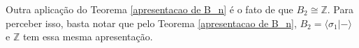 \documentclass[a4paper,portuguese,11pt,twoside, leqno]{book}
\theoremstyle{definition}
\newtheorem*{solution}{Solução}
\begin{document}
	
	
	
	
	
	
	
	
	\par\vspace{0.3cm} Outra aplicação do Teorema \eqref{apresentacao de B_n} é o fato de que $B_2\cong\mathbb{Z}$. Para perceber isso, basta notar que pelo Teorema \eqref{apresentacao de B_n}, $B_2 = \langle \sigma_1 | - \rangle$ e $\mathbb{Z}$ tem essa mesma apresentação. 
	
\end{document}
